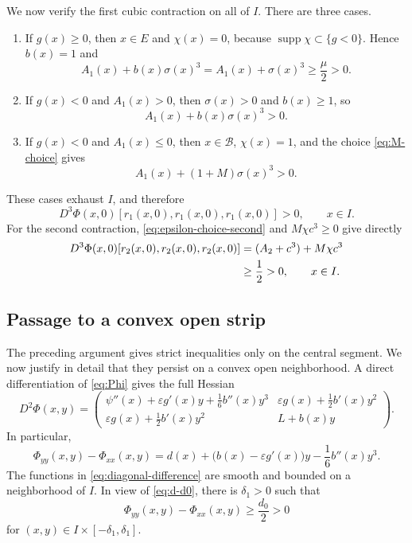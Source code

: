 \documentclass[11pt,reqno]{amsart}
\theoremstyle{definition}
\DeclareMathOperator{\supp}{supp}
\begin{document}
We now verify the first cubic contraction on all of $I$.  There are three
cases.
\begin{enumerate}
  \item If $g(x)\ge0$, then $x\in E$ and $\chi(x)=0$, because
  $\supp\chi\subset\{g<0\}$.  Hence $b(x)=1$ and
  \begin{equation}
    A_1(x)+b(x)\sigma(x)^3
    =A_1(x)+\sigma(x)^3
    \ge\frac\mu2>0.
  \end{equation}
  \item If $g(x)<0$ and $A_1(x)>0$, then $\sigma(x)>0$ and $b(x)\ge1$, so
  \begin{equation}
    A_1(x)+b(x)\sigma(x)^3>0.
  \end{equation}
  \item If $g(x)<0$ and $A_1(x)\le0$, then $x\in\mathcal B$,
  $\chi(x)=1$, and the choice \cref{eq:M-choice} gives
  \begin{equation}
    A_1(x)+(1+M)\sigma(x)^3>0.
  \end{equation}
\end{enumerate}
These cases exhaust $I$, and therefore
\begin{equation}
  D^3\Phi(x,0)[r_1(x,0),r_1(x,0),r_1(x,0)]>0,
  \qquad x\in I.
  \label{eq:first-positive-axis}
\end{equation}
For the second contraction, \cref{eq:epsilon-choice-second} and $M\chi c^3
\ge0$ give directly
\begin{align}
  D^3\Phi(x,0)[r_2(x,0),r_2(x,0),r_2(x,0)]
  &=(A_2+c^3)+M\chi c^3\notag\\
  &\ge\frac12>0,
  \qquad x\in I.
  \label{eq:second-positive-axis}
\end{align}

\subsection{Passage to a convex open strip}

The preceding argument gives strict inequalities only on the central segment.
We now justify in detail that they persist on a convex open neighborhood.  A
direct differentiation of \cref{eq:Phi} gives the full Hessian
\begin{equation}
  D^2\Phi(x,y)
  =
  \begin{pmatrix}
    \psi''(x)+\varepsilon g'(x)y+\frac16b''(x)y^3
    &\varepsilon g(x)+\frac12b'(x)y^2\\[1mm]
    \varepsilon g(x)+\frac12b'(x)y^2
    &L+b(x)y
  \end{pmatrix}.
  \label{eq:full-Hessian}
\end{equation}
In particular,
\begin{equation}
  \Phi_{yy}(x,y)-\Phi_{xx}(x,y)
  =d(x)+\bigl(b(x)-\varepsilon g'(x)\bigr)y
  -\frac16b''(x)y^3.
  \label{eq:diagonal-difference}
\end{equation}
The functions in \cref{eq:diagonal-difference} are smooth and bounded on a
neighborhood of $I$.  In view of \cref{eq:d-d0}, there is $\delta_1>0$ such
that
\begin{equation}
  \Phi_{yy}(x,y)-\Phi_{xx}(x,y)\ge\frac{d_0}{2}>0
\end{equation}
for $(x,y)\in I\times[-\delta_1,\delta_1]$.
\end{document}

